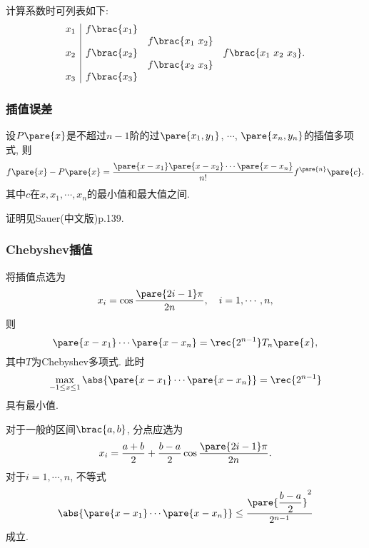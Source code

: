 \documentclass[20pt]{extarticle}
\begin{document}
计算系数时可列表如下:
\[ \begin{array}{c|ccc}
    x_1 & f\brac{x_1} \\
    & & f\brac{x_1\ x_2} \\
    x_2 & f\brac{x_2} & & f\brac{x_1\ x_2\ x_3}. \\
    & & f\brac{x_2\ x_3} \\
    x_3 & f\brac{x_3}
\end{array} \]


\subsubsection{插值误差} %
\label{ssub:插值误差}

\begin{theorem}
    设$P\pare{x}$是不超过$n-1$阶的过$\pare{x_1,y_1}$, $\cdots$, $\pare{x_n,y_n}$的插值多项式, 则
    \[ f\pare{x} - P\pare{x} = \frac{\pare{x-x_1}\pare{x-x_2}\cdots\pare{x-x_n}}{n!}f^{\pare{n}}\pare{c}. \]
    其中$c$在$x,x_1,\cdots,x_n$的最小值和最大值之间.
\end{theorem}
\begin{hardlink}
    证明见Sauer(中文版)p.139.
\end{hardlink}


\subsubsection{Chebyshev插值} %
\label{ssub:chebyshev插值}

\begin{theorem}
    将插值点选为
    \[ x_i = \cos \frac{\pare{2i-1}\pi}{2n},\quad i = 1,\cdots, n, \]
    则
    \[ \pare{x-x_1}\cdots\pare{x-x_n} = \rec{2^{n-1}}T_n\pare{x}, \]
    其中$T$为Chebyshev多项式. 此时
    \[ \max_{-1\le x\le 1}\abs{\pare{x-x_1}\cdots\pare{x-x_n}} = \rec{2^{n-1}} \]
    具有最小值.
\end{theorem}
\begin{corollary}
    对于一般的区间$\brac{a,b}$, 分点应选为
    \[ x_i = \frac{a+b}{2} + \frac{b-a}{2} \cos \frac{\pare{2i-1}\pi}{2n}. \]
    对于$i=1,\cdots,n$, 不等式
    \[ \abs{\pare{x-x_1}\cdots\pare{x-x_n}} \le \frac{\displaystyle \pare{\frac{b-a}{2}}^2}{2^{n-1}} \]
    成立.
\end{corollary}

\end{document}
